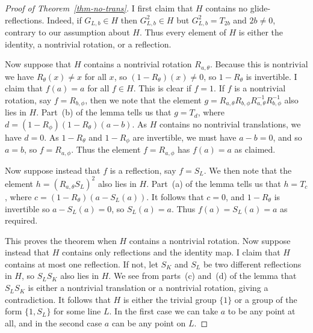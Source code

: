 \documentclass{amsart}
\newcommand{\tht}       {\theta}
\renewcommand{\:}{\colon}
\theoremstyle{definition}
\begin{document}
\begin{proof}[Proof of Theorem~\ref{thm-no-trans}]
 I first claim that $H$ contains no glide-reflections.  Indeed, if
 $G_{L,b}\in H$ then $G_{L,b}^2\in H$ but $G_{L,b}^2=T_{2b}$ and
 $2b\neq 0$, contrary to our assumption about $H$.  Thus every element
 of $H$ is either the identity, a nontrivial rotation, or a
 reflection.

 Now suppose that $H$ contains a nontrivial rotation $R_{a,\theta}$.
 Because this is nontrivial we have $R_\theta(x)\neq x$ for all $x$, so
 $(1-R_\theta)(x)\neq 0$, so $1-R_\theta$ is invertible.  I claim that
 $f(a)=a$ for all $f\in H$.  This is clear if $f=1$.  If $f$ is a
 nontrivial rotation, say $f=R_{b,\phi}$, then we note that the
 element $g=R_{a,\theta}R_{b,\phi}R_{a,\theta}^{-1}R_{b,\phi}^{-1}$ also
 lies in $H$.  Part~(b) of the lemma tells us that $g=T_d$, where
 $d=(1-R_\phi)(1-R_\tht)(a-b)$.  As $H$ contains no nontrivial
 translations, we have $d=0$.  As $1-R_\theta$ and $1-R_\phi$ are
 invertible, we must have $a-b=0$, and so $a=b$, so $f=R_{a,\phi}$.
 Thus the element $f=R_{a,\phi}$ has $f(a)=a$ as claimed.

 Now suppose instead that $f$ is a reflection, say $f=S_L$.  We then
 note that the element $h=(R_{a,\theta}S_L)^2$ also lies in $H$.
 Part~(a) of the lemma tells us that $h=T_c$, where
 $c=(1-R_\theta)(a-S_L(a))$.  It follows that $c=0$, and $1-R_\theta$ is
 invertible so $a-S_L(a)=0$, so $S_L(a)=a$.  Thus $f(a)=S_L(a)=a$ as
 required. 

 This proves the theorem when $H$ contains a nontrivial rotation.  Now
 suppose instead that $H$ contains only reflections and the identity
 map.  I claim that $H$ contains at most one reflection.  If not, let
 $S_K$ and $S_L$ be two different reflections in $H$, so $S_LS_K$ also
 lies in $H$.  We see from parts~(c) and~(d) of the lemma that
 $S_LS_K$ is either a nontrivial translation or a nontrivial rotation,
 giving a contradiction.  It follows that $H$ is either the trivial
 group $\{1\}$ or a group of the form $\{1,S_L\}$ for some line $L$.
 In the first case we can take $a$ to be any point at all, and in the
 second case $a$ can be any point on $L$.
\end{proof}
\end{document}
